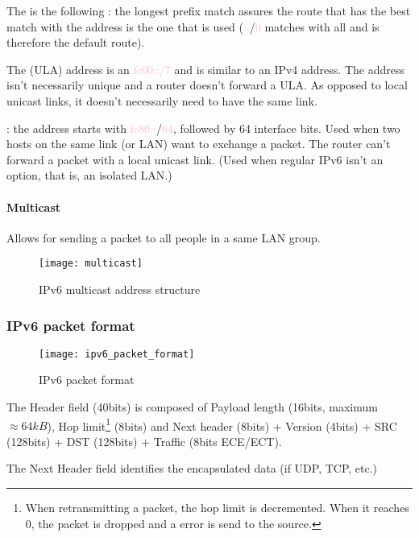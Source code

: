 The  is the following : the longest prefix match assures the route that has the best match with the address is the one that is used (\textcolor{pink}{::}/\textcolor{pink}{0} matches with all and is therefore the default route).

The  (ULA) address is an \textcolor{pink}{fc00::/7} and is similar to an IPv4 address. The address isn’t necessarily unique and a router doesn’t forward a ULA. As opposed to local unicast links, it doesn’t necessarily need to have the same link.

 : the address starts with \textcolor{pink}{fe80::}/\textcolor{pink}{64}, followed by 64 interface bits. Used when two hosts on the same link (or LAN) want to exchange a packet. The router can’t forward a packet with a local unicast link. (Used when regular IPv6 isn’t an option, that is, an isolated LAN.)

\paragraph{Multicast}

Allows for sending a packet to all people in a same LAN group.

\begin{figure}[H]
    \centering
    \texttt{[image: multicast]}
    \caption{IPv6 multicast address structure}
\end{figure}

\subsubsection{IPv6 packet format}

\begin{figure}[H]
    \centering
    \texttt{[image: ipv6\_packet\_format]}
    \caption{IPv6 packet format}
\end{figure}

The Header field (40bits) is composed of Payload length (16bits, maximum $\approx 64kB$), Hop limit\footnote{When retransmitting a packet, the hop limit is decremented. When it reaches 0, the packet is dropped and a error is send to the source.} (8bits) and Next header (8bits) + Version (4bits) + SRC (128bits) + DST (128bits) + Traffic (8bits ECE/ECT).

The Next Header field identifies the encapsulated data (if UDP, TCP, etc.)

